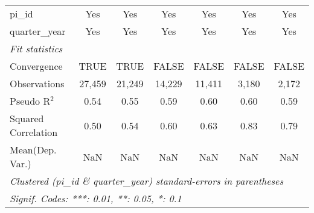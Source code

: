 \begin{tabular}{lcccccc}
   pi\_id                                                     & Yes           & Yes           & Yes           & Yes           & Yes           & Yes\\  
   quarter\_year                                              & Yes           & Yes           & Yes           & Yes           & Yes           & Yes\\  
   \midrule
   \emph{Fit statistics}\\
   Convergence                                                &TRUE           & TRUE          & FALSE         & FALSE         & FALSE         & FALSE\\  
   Observations                                               & 27,459        & 21,249        & 14,229        & 11,411        & 3,180         & 2,172\\  
   Pseudo R$^2$                                               & 0.54          & 0.55          & 0.59          & 0.60          & 0.60          & 0.59\\  
   Squared Correlation                                        & 0.50          & 0.54          & 0.60          & 0.63          & 0.83          & 0.79\\  
Mean(Dep. Var.) & NaN & NaN & NaN & NaN & NaN & NaN \\
   \midrule \midrule
   \multicolumn{7}{l}{\emph{Clustered (pi\_id \& quarter\_year) standard-errors in parentheses}}\\
   \multicolumn{7}{l}{\emph{Signif. Codes: ***: 0.01, **: 0.05, *: 0.1}}\\
\end{tabular}
\par\endgroup
